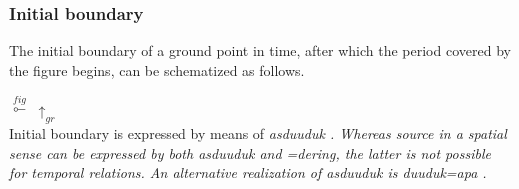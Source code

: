 


\subsubsection{Initial boundary}\label{sec:func:Initialboundary}
The initial boundary of a ground point in time, after which the period covered by the figure begins, can be schematized as follows.

\ea $\stackrel{fig}{\multimapinv }$\z
  \vspace{-0.5cm}\hspace{1.2cm}  $\uparrow_{gr} $\\

Initial boundary is expressed by means of \em asduuduk \em {}. Whereas source in a spatial sense can be expressed by both \em asduuduk \em and \em =dering\em, the latter is not possible for temporal relations. An alternative realization of \em asduuduk \em is \em duuduk=apa \em {}.


%



